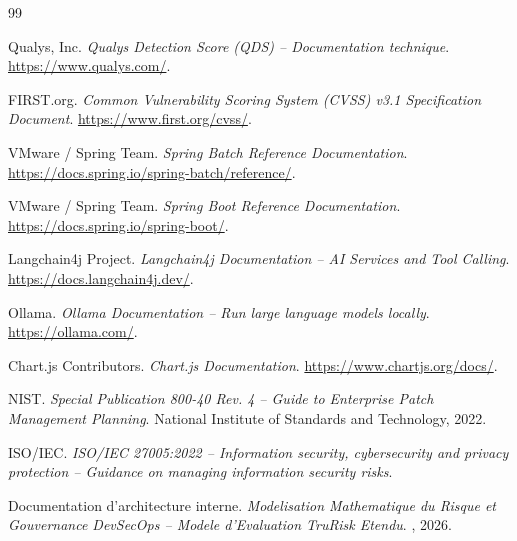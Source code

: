 \begin{thebibliography}{99}

Qualys, Inc. \emph{Qualys Detection Score (QDS) -- Documentation technique}.
\url{https://www.qualys.com/}.

FIRST.org. \emph{Common Vulnerability Scoring System (CVSS) v3.1 Specification
Document}. \url{https://www.first.org/cvss/}.

VMware / Spring Team. \emph{Spring Batch Reference Documentation}.
\url{https://docs.spring.io/spring-batch/reference/}.

VMware / Spring Team. \emph{Spring Boot Reference Documentation}.
\url{https://docs.spring.io/spring-boot/}.

Langchain4j Project. \emph{Langchain4j Documentation -- AI Services and Tool
Calling}. \url{https://docs.langchain4j.dev/}.

Ollama. \emph{Ollama Documentation -- Run large language models locally}.
\url{https://ollama.com/}.

Chart.js Contributors. \emph{Chart.js Documentation}.
\url{https://www.chartjs.org/docs/}.

NIST. \emph{Special Publication 800-40 Rev. 4 -- Guide to Enterprise Patch
Management Planning}. National Institute of Standards and Technology, 2022.

ISO/IEC. \emph{ISO/IEC 27005:2022 -- Information security, cybersecurity and
privacy protection -- Guidance on managing information security risks}.

Documentation d'architecture interne. \emph{Modelisation Mathematique du Risque et
Gouvernance DevSecOps -- Modele d'Evaluation TruRisk Etendu}.
\organisme, 2026.

\end{thebibliography}
